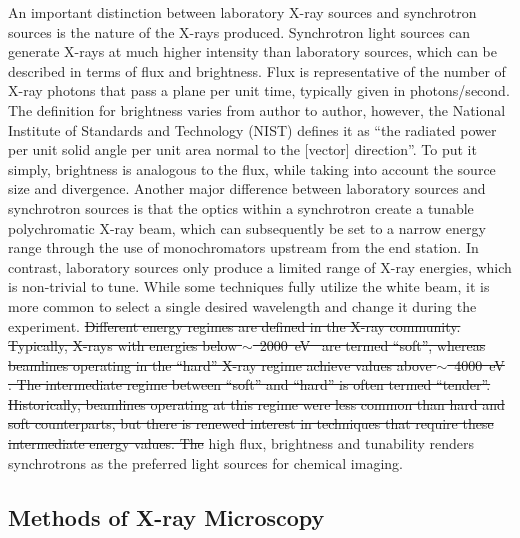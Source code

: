 \documentclass[journal=cmatex,manuscript=perspective]{achemso}
\providecommand{\DIFaddtex}[1]{{\protect\color{blue}\uwave{#1}}} %
\providecommand{\DIFdeltex}[1]{{\protect\color{red}\sout{#1}}}                      %
\providecommand{\DIFaddbegin}{} %
\providecommand{\DIFaddend}{} %
\providecommand{\DIFdelbegin}{} %
\providecommand{\DIFdelend}{} %
\providecommand{\DIFadd}[1]{\texorpdfstring{\DIFaddtex{#1}}{#1}} %
\providecommand{\DIFdel}[1]{\texorpdfstring{\DIFdeltex{#1}}{}} %
\begin{document}
An important distinction between laboratory X-ray sources and
synchrotron sources is the nature of the X-rays produced. Synchrotron
light sources can generate X-rays at much higher intensity than
laboratory sources, which can be described in terms of flux and
brightness. Flux is representative of the number of X-ray photons that
pass a plane per unit time, typically given in photons/second. The
definition for brightness varies from author to author, however, the
National Institute of Standards and Technology (NIST) defines it as
``the radiated power per unit solid angle per unit area normal to the
[vector] direction''\cite{sesame2004}. To put it simply, brightness is
analogous to the flux, while taking into account the source size and
divergence. Another major difference between laboratory sources and
synchrotron sources is that the optics within a synchrotron create a
tunable polychromatic X-ray beam, which can subsequently be set to a
narrow energy range through the use of monochromators upstream from
the end station. In contrast, laboratory sources only produce a
limited range of X-ray energies, which is non-trivial to tune. While
some techniques fully utilize the white beam\cite{ice2009}, it is more
common to select a single desired wavelength and change it during the
experiment. \DIFdelbegin \DIFdel{Different energy regimes are defined in the X-ray
community. Typically, X-rays with energies below $\sim$\mbox{%
\SI{2000}{eV}
}%
are termed ``soft'', whereas beamlines operating in the ``hard'' X-ray
regime achieve values above $\sim$\mbox{%
\SI{4000}{eV}}%
. The intermediate
regime between ``soft'' and ``hard'' is often termed
``tender''. Historically, beamlines operating at this regime were less
common than hard and soft counterparts, but there is renewed interest
in techniques that require these intermediate energy values. The }\DIFdelend \DIFaddbegin \DIFadd{The }\DIFaddend high flux, brightness and tunability renders synchrotrons as the preferred
light sources for chemical imaging.

\subsection{Methods of X-ray Microscopy}
\end{document}
